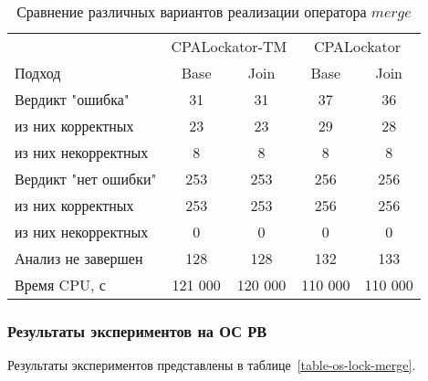\begin{center}
  \begin{table}[h]\footnotesize \centering
  	\label{table-drivers-lock-merge}
    \caption{Сравнение различных вариантов реализации оператора $merge$}
    \begin{tabular}{ | l | c | c | c | c | }
      \hline
      		& 		\multicolumn{2}{|c|}{CPALockator-TM} 	& \multicolumn{2}{|c|}{CPALockator}  \\
      Подход         				& Base 		& Join 		& Base 		& Join   	\\ \hline
      Вердикт "ошибка" 				& 31   		& 31   		& 37   		& 36   		\\ 
  \hspace{0.5cm} из них корректных 	& 23 		& 23 		& 29   		& 28     	\\ 
  \hspace{0.5cm} из них некорректных & 8 		& 8 		& 8   		& 8     	\\ \hline
      Вердикт "нет ошибки"  		& 253    	& 253   	& 256    	& 256      	\\ 
  \hspace{0.5cm} из них корректных 	& 253 		& 253   	& 256    	& 256     	\\
  \hspace{0.5cm} из них некорректных & 0 		& 0    		& 0     	& 0  		\\ \hline
      Анализ не завершен       		& 128    	& 128   	& 132    	& 133     	\\ \hline
      Время CPU, с   				& 121 000 	& 120 000 	& 110 000 	& 110 000   \\ 
      \hline
    \end{tabular}
  \end{table}
\end{center}

\subsubsection{Результаты экспериментов на ОС РВ}

Результаты экспериментов представлены в таблице~\ref{table-os-lock-merge}.

